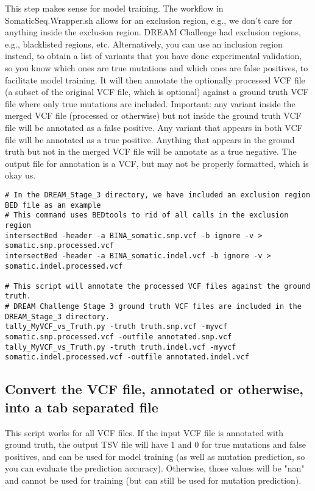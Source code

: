 \documentclass[10pt,letterpaper]{article}
\begin{document}
\begin{sloppypar}
This step makes sense for model training. The workflow in SomaticSeq.Wrapper.sh allows for an exclusion region, e.g., we don't care for anything inside the exclusion region. DREAM Challenge had exclusion regions, e.g., blacklisted regions, etc. Alternatively, you can use an inclusion region instead, to obtain a list of variants that you have done experimental validation, so you know which ones are true mutations and which ones are false positives, to facilitate model training. 
It will then annotate the optionally processed VCF file (a subset of the original VCF file, which is optional) against a ground truth VCF file where only true mutations are included. Important: any variant inside the merged VCF file (processed or otherwise) but not inside the ground truth VCF file will be annotated as a false positive. Any variant that appears in both VCF file will be annotated as a true positive. Anything that appears in the ground truth but not in the merged VCF file will be annotate as a true negative. The output file for annotation is a VCF, but may not be properly formatted, which is okay us. 
	
\begin{lstlisting}
# In the DREAM_Stage_3 directory, we have included an exclusion region BED file as an example
# This command uses BEDtools to rid of all calls in the exclusion region
intersectBed -header -a BINA_somatic.snp.vcf -b ignore -v > somatic.snp.processed.vcf
intersectBed -header -a BINA_somatic.indel.vcf -b ignore -v > somatic.indel.processed.vcf
	
# This script will annotate the processed VCF files against the ground truth.
# DREAM Challenge Stage 3 ground truth VCF files are included in the DREAM_Stage_3 directory.
tally_MyVCF_vs_Truth.py -truth truth.snp.vcf -myvcf somatic.snp.processed.vcf -outfile annotated.snp.vcf
tally_MyVCF_vs_Truth.py -truth truth.indel.vcf -myvcf somatic.indel.processed.vcf -outfile annotated.indel.vcf
\end{lstlisting}



\subsection{Convert the VCF file, annotated or otherwise, into a tab separated file}
This script works for all VCF files. If the input VCF file is annotated with ground truth, the output TSV file will have 1 and 0 for true mutations and false positives, and can be used for model training (as well as mutation prediction, so you can evaluate the prediction accuracy). Otherwise, those values will be "nan" and cannot be used for training (but can still be used for mutation prediction). 
	

\end{sloppypar}
\end{document}
